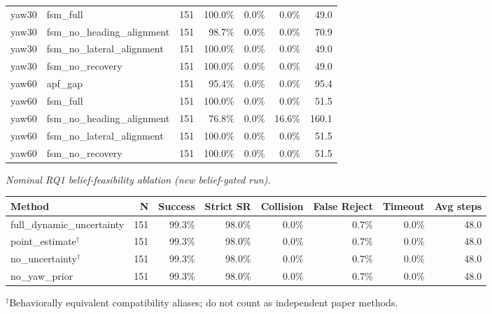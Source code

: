 \begin{tabular}{llrrrrr}
yaw30 & fsm\_full & 151 & 100.0\% & 0.0\% & 0.0\% & 49.0 \\
yaw30 & fsm\_no\_heading\_alignment & 151 & 98.7\% & 0.0\% & 0.0\% & 70.9 \\
yaw30 & fsm\_no\_lateral\_alignment & 151 & 100.0\% & 0.0\% & 0.0\% & 49.0 \\
yaw30 & fsm\_no\_recovery & 151 & 100.0\% & 0.0\% & 0.0\% & 49.0 \\
yaw60 & apf\_gap & 151 & 95.4\% & 0.0\% & 0.0\% & 95.4 \\
yaw60 & fsm\_full & 151 & 100.0\% & 0.0\% & 0.0\% & 51.5 \\
yaw60 & fsm\_no\_heading\_alignment & 151 & 76.8\% & 0.0\% & 16.6\% & 160.1 \\
yaw60 & fsm\_no\_lateral\_alignment & 151 & 100.0\% & 0.0\% & 0.0\% & 51.5 \\
yaw60 & fsm\_no\_recovery & 151 & 100.0\% & 0.0\% & 0.0\% & 51.5 \\
\bottomrule
\end{tabular}

\par\medskip
\noindent\textit{Nominal RQ1 belief-feasibility ablation (new belief-gated run).}

\begin{tabular}{lrrrrrrr}
\toprule
Method & N & Success & Strict SR & Collision & False Reject & Timeout & Avg steps \\
\midrule
full\_dynamic\_uncertainty & 151 & 99.3\% & 98.0\% & 0.0\% & 0.7\% & 0.0\% & 48.0 \\
point\_estimate$^{\dagger}$ & 151 & 99.3\% & 98.0\% & 0.0\% & 0.7\% & 0.0\% & 48.0 \\
no\_uncertainty$^{\dagger}$ & 151 & 99.3\% & 98.0\% & 0.0\% & 0.7\% & 0.0\% & 48.0 \\
no\_yaw\_prior & 151 & 99.3\% & 98.0\% & 0.0\% & 0.7\% & 0.0\% & 48.0 \\
\bottomrule
\end{tabular}

\par\footnotesize $^{\dagger}$Behaviorally equivalent compatibility aliases; do not count as independent paper methods.\normalsize
